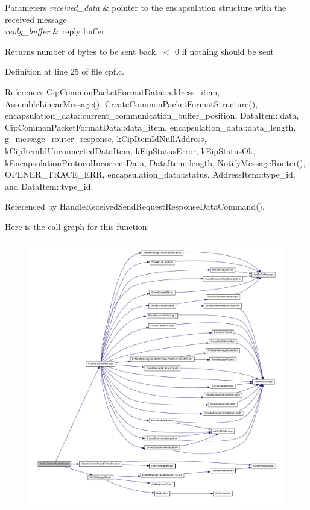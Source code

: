 \begin{DoxyParams}{\-Parameters}
{\em received\-\_\-data} & pointer to the encapsulation structure with the received message \\
\hline
{\em reply\-\_\-buffer} & reply buffer \\
\hline
\end{DoxyParams}
\begin{DoxyReturn}{\-Returns}
number of bytes to be sent back. $<$ 0 if nothing should be sent 
\end{DoxyReturn}


\-Definition at line 25 of file cpf.\-c.



\-References \-Cip\-Common\-Packet\-Format\-Data\-::address\-\_\-item, \-Assemble\-Linear\-Message(), \-Create\-Common\-Packet\-Format\-Structure(), encapsulation\-\_\-data\-::current\-\_\-communication\-\_\-buffer\-\_\-position, \-Data\-Item\-::data, \-Cip\-Common\-Packet\-Format\-Data\-::data\-\_\-item, encapsulation\-\_\-data\-::data\-\_\-length, g\-\_\-message\-\_\-router\-\_\-response, k\-Cip\-Item\-Id\-Null\-Address, k\-Cip\-Item\-Id\-Unconnected\-Data\-Item, k\-Eip\-Status\-Error, k\-Eip\-Status\-Ok, k\-Encapsulation\-Protocol\-Incorrect\-Data, \-Data\-Item\-::length, \-Notify\-Message\-Router(), \-O\-P\-E\-N\-E\-R\-\_\-\-T\-R\-A\-C\-E\-\_\-\-E\-R\-R, encapsulation\-\_\-data\-::status, \-Address\-Item\-::type\-\_\-id, and \-Data\-Item\-::type\-\_\-id.



\-Referenced by \-Handle\-Received\-Send\-Request\-Response\-Data\-Command().



\-Here is the call graph for this function\-:
\nopagebreak
\begin{figure}[H]
\begin{center}
\leavevmode
\includegraphics[width=350pt]{d4/d91/group__ENCAP_ga401f152f47e54b0a6dddcfe723c086f9_cgraph}
\end{center}
\end{figure}




